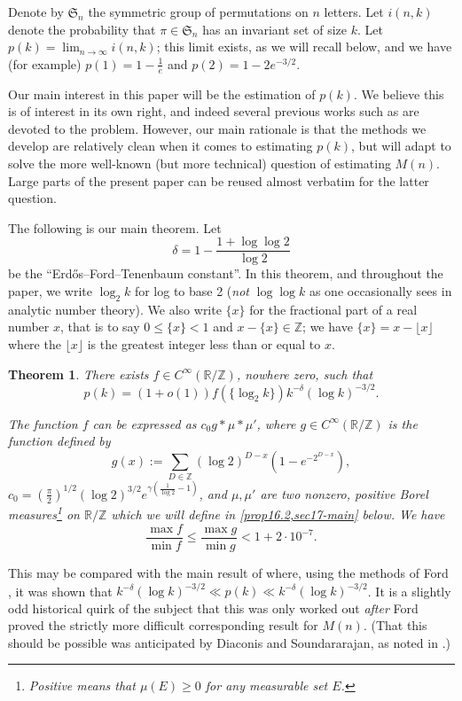 \documentclass[11pt,reqno]{amsart}
\numberwithin{equation}{section}
\newtheorem{theorem}{Theorem}[section]
\theoremstyle{definition}
\theoremstyle{remark}
\newcommand{\mf}{\mathfrak}
\renewcommand{\le}{\leqslant}
\renewcommand{\ge}{\geqslant}
\newcommand\Z{\mathbb{Z}}
\newcommand\R{\mathbb{R}}
\begin{document}
Denote by $\mf{S}_n$ the symmetric group of permutations on $n$ letters. Let $i(n,k)$ denote the probability that $\pi\in \mf{S}_n$ has an invariant set of size $k$. Let $p(k) = \lim_{n\to \infty} i(n,k)$; this limit exists, as we will recall below, and we have (for example) $p(1) = 1 - \frac{1}{e}$ and $p(2) = 1 - 2 e^{-3/2}$. 

Our main interest in this paper will be the estimation of $p(k)$. We believe this is of interest in its own right, and indeed several previous works such as \cite{dfg,EFG16,luzcak-pyber} are devoted to the problem. However, our main rationale is that the methods we develop are relatively clean when it comes to estimating $p(k)$, but will adapt to solve the more well-known (but more technical) question of estimating $M(n)$. Large parts of the present paper can be reused almost verbatim for the latter question.

The following is our main theorem. Let 
\begin{equation}\label{eft-def} \delta = 1 - \frac{1+\log\log 2}{\log 2}\end{equation} be the ``Erd\H{o}s--Ford--Tenenbaum constant''. In this theorem, and throughout the paper, we write $\log_2 k$ for log to base 2 (\emph{not} $\log \log k$ as one occasionally sees in analytic number theory). We also write $\{x\}$ for the fractional part of a real number $x$, that is to say $0 \le \{x \} < 1$ and $x - \{x \} \in \Z$; we have $\{x\} = x - \lfloor x \rfloor$ where the $\lfloor x \rfloor$ is the greatest integer less than or equal to $x$.
\begin{theorem}\label{thm:main}
There exists $f \in C^{\infty}(\R/\Z)$, nowhere zero, such that 
\[ p(k) =  (1 + o(1)) f(\{ \log_2 k \}) k^{-\delta} (\log k)^{-3/2}.\]

The function $f$ can be expressed as $c_0 g \ast \mu \ast \mu'$, where $g \in C^{\infty}(\R/\Z)$ is the function defined by 
\begin{equation}\label{g-funct-def} g(x) := \sum_{D \in \Z} (\log 2)^{D - x} (1 - e^{-2^{D - x}}),\end{equation} $c_0 = (\frac{\pi}{2})^{1/2} (\log 2)^{3/2} e^{\gamma(\frac{1}{\log 2} - 1)}$, and $\mu, \mu'$ are two nonzero, positive Borel measures\footnote{\emph{Positive} means that $\mu(E) \ge 0$ for any measurable set $E$.} on $\R/\Z$ which we will define in \cref{prop16.2,sec17-main} below. We have
\[ \frac{\max f}{\min f} \le \frac{\max g}{\min g} < 1 + 2\cdot 10^{-7}.\]
\end{theorem}
This may be compared with the main result of \cite{EFG16} where, using the methods of Ford \cite{For08}, it was shown that $k^{-\delta} (\log k)^{-3/2} \ll p(k) \ll k^{-\delta} (\log k)^{-3/2}$. It is a slightly odd historical quirk of the subject that this was only worked out \emph{after} Ford proved the strictly more difficult corresponding result for $M(n)$. (That this should be possible was anticipated by Diaconis and Soundararajan, as noted in \cite{sound-pk-remark}.)
\end{document}
